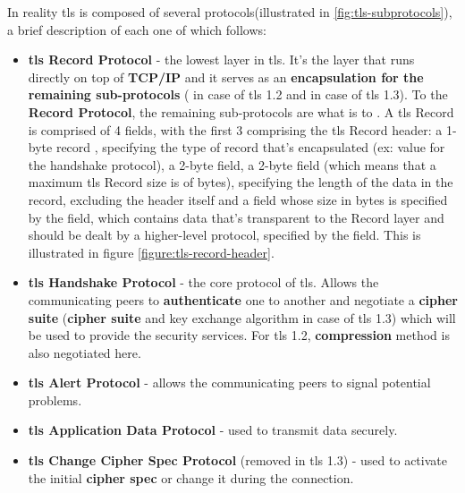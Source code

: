 \documentclass{llncs}
\begin{document}
In reality \gls{tls} is composed of several protocols(illustrated in \ref{fig:tls-subprotocols}), a brief description of each
one of which follows:
\begin{itemize}
  \item \textbf{\gls{tls} Record Protocol} - the lowest layer in \gls{tls}. It's
  the layer that runs directly on top of \textbf{TCP/IP} and it serves as an
   \textbf{encapsulation for the remaining sub-protocols} ( in case of \gls{tls} 1.2
   and  in case of \gls{tls} 1.3). To the  \textbf{Record Protocol},
   the remaining sub-protocols are what  is to .
   A \gls{tls} Record is comprised of 4 fields, with the first 3 comprising the
   \gls{tls} Record header: a 1-byte record ,
   specifying the type of record that's encapsulated (ex: value 
   for the handshake protocol), a 2-byte  field, a
   2-byte  field (which means that a maximum \gls{tls} Record size
   is of  bytes), specifying the length of the data in the record, excluding
   the header itself and a  field whose size in bytes is specified
   by the  field, which contains data that's
   transparent to the Record layer and should be dealt by a higher-level protocol,
   specified by the  field. This is illustrated in figure \ref{figure:tls-record-header}.
  \item \textbf{\gls{tls} Handshake Protocol} - the core protocol of \gls{tls}.
  Allows the communicating peers to \textbf{authenticate} one to another and negotiate
  a \textbf{cipher suite} (\textbf{cipher suite} and key exchange algorithm in case of \gls{tls} 1.3) which will be used to provide the security services. For \gls{tls} 1.2,
  \textbf{compression} method is also negotiated here.
  \item \textbf{\gls{tls} Alert Protocol} - allows the communicating peers to
  signal potential problems.
  \item \textbf{\gls{tls} Application Data Protocol} - used to transmit data securely.
  \item \textbf{\gls{tls} Change Cipher Spec Protocol} (removed in \gls{tls} 1.3) -
  used to activate the initial \textbf{cipher spec} or change it during the connection.
\end{itemize}
\end{document}
